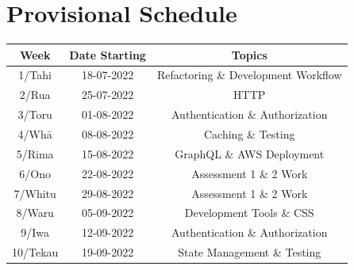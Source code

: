 \documentclass{article}
\begin{document}
\section*{Provisional Schedule}

\renewcommand{\arraystretch}{1.5}
\begin{tabular}{|c|c|c|c|}
	\hline
	\textbf{Week}                  & \textbf{Date Starting}            & \multicolumn{2}{c|}{\textbf{Topics}}                                                                                             \\ \hline
	\footnotesize 1/Tahi           & \footnotesize 18-07-2022 & \multicolumn{2}{c|}{\footnotesize Refactoring  \& Development Workflow}    \\ \hline
	\footnotesize 2/Rua            & \footnotesize 25-07-2022 & \multicolumn{2}{c|}{\footnotesize HTTP}                   \\ \hline
	\footnotesize 3/Toru           & \footnotesize 01-08-2022 & \multicolumn{2}{c|}{\footnotesize Authentication  \& Authorization} \\ \hline
	\footnotesize 4/Whā            & \footnotesize 08-08-2022 & \multicolumn{2}{c|}{\footnotesize Caching  \& Testing}                               \\ \hline
	\footnotesize 5/Rima           & \footnotesize 15-08-2022 & \multicolumn{2}{c|}{\footnotesize GraphQL  \& AWS Deployment}                                                \\ \hline
	\footnotesize 6/Ono            & \footnotesize 22-08-2022 &  \multicolumn{2}{c|}{\footnotesize Assessment 1  \& 2 Work}                            \\ \hline
	\footnotesize 7/Whitu          & \footnotesize 29-08-2022 & \multicolumn{2}{c|}{\footnotesize Assessment 1  \& 2 Work}                                                   \\ \hline
	\footnotesize 8/Waru           & \footnotesize 05-09-2022 & \multicolumn{2}{c|}{\footnotesize Development Tools  \& CSS }                                                   \\ \hline
	\footnotesize 9/Iwa            & \footnotesize 12-09-2022 & \multicolumn{2}{c|}{\footnotesize Authentication  \& Authorization}                                                                 \\ \hline
	\footnotesize 10/Tekau         & \footnotesize 19-09-2022 & \multicolumn{2}{c|}{\footnotesize State Management  \& Testing}                                                                 \\ \hline


\end{tabular}
\end{document}
